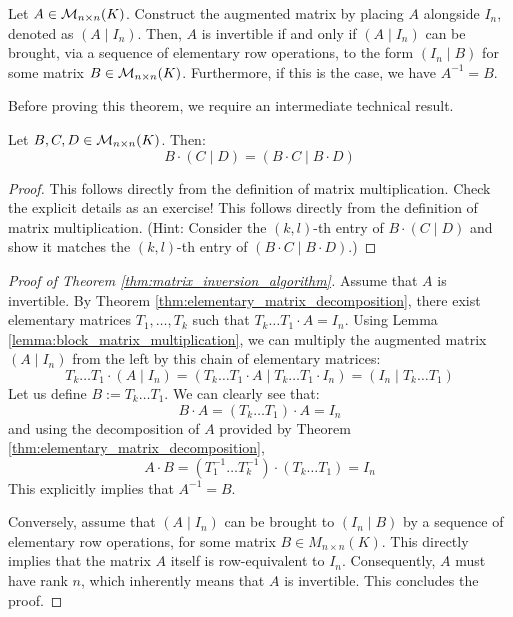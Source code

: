 \begin{theorem}
\label{thm:matrix_inversion_algorithm}
Let $A \in \mathcal{M}_{n \times n}(K)$. Construct the augmented matrix by placing $A$ alongside $I_n$, denoted as $(A \mid I_n)$. Then, $A$ is invertible if and only if $(A \mid I_n)$ can be brought, via a sequence of elementary row operations, to the form $(I_n \mid B)$ for some matrix $B \in \mathcal{M}_{n \times n}(K)$. Furthermore, if this is the case, we have $A^{-1} = B$.
\end{theorem}

Before proving this theorem, we require an intermediate technical result.

\begin{lemma}
\label{lemma:block_matrix_multiplication}
Let $B, C, D \in \mathcal{M}_{n \times n}(K)$. Then:
\begin{equation*}
    B \cdot \left(C \mid D\right) = \left(B \cdot C \mid B \cdot D\right)
\end{equation*}
\end{lemma}

\begin{proof}
This follows directly from the definition of matrix multiplication. Check the explicit details as an exercise!
This follows directly from the definition of matrix multiplication. (Hint: Consider the $(k,l)$-th entry of $B \cdot (C \mid D)$ and show it matches the $(k,l)$-th entry of $(B \cdot C \mid B \cdot D)$.)
\end{proof}

\begin{proof}[Proof of Theorem \ref{thm:matrix_inversion_algorithm}]
Assume that $A$ is invertible. By Theorem \ref{thm:elementary_matrix_decomposition}, there exist elementary matrices $T_1, \dots, T_k$ such that $T_k \dots T_1 \cdot A = I_n$. Using Lemma \ref{lemma:block_matrix_multiplication}, we can multiply the augmented matrix $(A \mid I_n)$ from the left by this chain of elementary matrices:
\begin{equation*}
    T_k \dots T_1 \cdot \left(A \mid I_n\right) = \left(T_k \dots T_1 \cdot A \mid T_k \dots T_1 \cdot I_n\right) = \left(I_n \mid T_k \dots T_1\right)
\end{equation*}
Let us define $B := T_k \dots T_1$. We can clearly see that:
\begin{equation*}
    B \cdot A = (T_k \dots T_1) \cdot A = I_n
\end{equation*}
and using the decomposition of $A$ provided by Theorem \ref{thm:elementary_matrix_decomposition},
\begin{equation*}
    A \cdot B = (T_1^{-1} \dots T_k^{-1}) \cdot (T_k \dots T_1) = I_n
\end{equation*}
This explicitly implies that $A^{-1} = B$.

Conversely, assume that $(A \mid I_n)$ can be brought to $(I_n \mid B)$ by a sequence of elementary row operations, for some matrix $B \in M_{n \times n}(K)$. This directly implies that the matrix $A$ itself is row-equivalent to $I_n$. Consequently, $A$ must have rank $n$, which inherently means that $A$ is invertible. This concludes the proof.
\end{proof}

